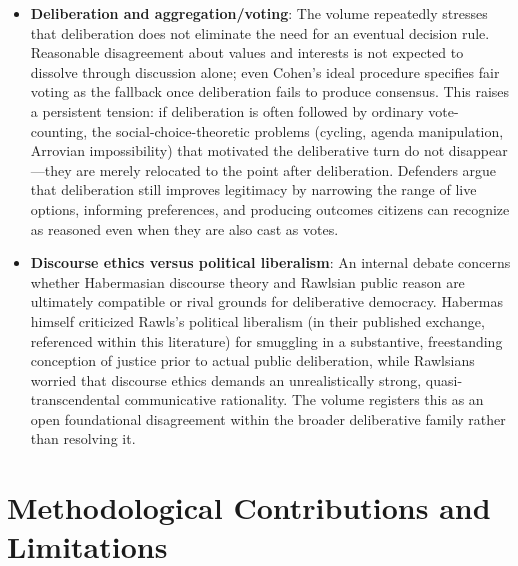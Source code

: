 \documentclass[12pt]{article}
\begin{document}
\begin{itemize}[leftmargin=*, itemsep=4pt]
    \item \textbf{Deliberation and aggregation/voting}: The volume repeatedly stresses that deliberation does not eliminate the need for an eventual decision rule. Reasonable disagreement about values and interests is not expected to dissolve through discussion alone; even Cohen's ideal procedure specifies fair voting as the fallback once deliberation fails to produce consensus. This raises a persistent tension: if deliberation is often followed by ordinary vote-counting, the social-choice-theoretic problems (cycling, agenda manipulation, Arrovian impossibility) that motivated the deliberative turn do not disappear---they are merely relocated to the point after deliberation. Defenders argue that deliberation still improves legitimacy by narrowing the range of live options, informing preferences, and producing outcomes citizens can recognize as reasoned even when they are also cast as votes.
    \item \textbf{Discourse ethics versus political liberalism}: An internal debate concerns whether Habermasian discourse theory and Rawlsian public reason are ultimately compatible or rival grounds for deliberative democracy. Habermas himself criticized Rawls's political liberalism (in their published exchange, referenced within this literature) for smuggling in a substantive, freestanding conception of justice prior to actual public deliberation, while Rawlsians worried that discourse ethics demands an unrealistically strong, quasi-transcendental communicative rationality. The volume registers this as an open foundational disagreement within the broader deliberative family rather than resolving it.
\end{itemize}

\section{Methodological Contributions and Limitations}
\end{document}
